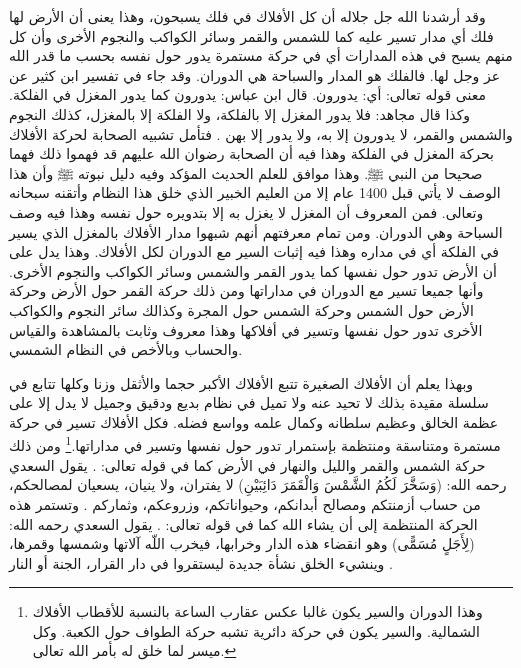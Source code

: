 وقد أرشدنا الله جل جلاله أن كل الأفلاك في فلك يسبحون، وهذا يعنى أن الأرض لها فلك أي مدار تسير عليه كما للشمس والقمر وسائر الكواكب والنجوم الأخرى وأن كل منهم يسبح في هذه المدارات أي في حركة مستمرة يدور حول نفسه بحسب ما قدر الله عز وجل لها. فالفلك هو المدار والسباحة هي الدوران. وقد جاء في تفسير ابن كثير عن معنى قوله تعالى: \quranayah*[36][40][12] {\footnotesize (\surahname*[36])} أي: يدورون. قال ابن عباس: يدورون كما يدور المغزل في الفلكة. وكذا قال مجاهد: فلا يدور المغزل إلا بالفلكة، ولا الفلكة إلا بالمغزل، كذلك النجوم والشمس والقمر، لا يدورون إلا به، ولا يدور إلا بهن \href{https://shamela.ws/book/8473/2750#p4}{\faExternalLink} \cite{tafsir_ibnKathir}. فتأمل تشبيه الصحابة لحركة الأفلاك بحركة المغزل في الفلكة وهذا فيه أن الصحابة رضوان الله عليهم قد فهموا ذلك فهما صحيحا من النبي ﷺ. وهذا موافق للعلم الحديث المؤكد وفيه دليل نبوته ﷺ وأن هذا الوصف لا يأتي قبل 1400 عام إلا من العليم الخبير الذي خلق هذا النظام وأتقنه سبحانه وتعالى. فمن المعروف أن المغزل لا يغزل به إلا بتدويره حول نفسه وهذا فيه وصف السباحة وهي الدوران. ومن تمام معرفتهم أنهم شبهوا مدار الأفلاك بالمغزل الذي يسير في الفلكة أي في مداره وهذا فيه إثبات السير مع الدوران لكل الأفلاك. وهذا يدل على أن الأرض تدور حول نفسها كما يدور القمر والشمس وسائر الكواكب والنجوم الأخرى. وأنها جميعا تسير مع الدوران في مداراتها ومن ذلك حركة القمر حول الأرض وحركة الأرض حول الشمس وحركة الشمس حول المجرة وكذالك سائر النجوم والكواكب الأخرى تدور حول نفسها وتسير في أفلاكها وهذا معروف وثابت بالمشاهدة والقياس والحساب وبالأخص في النظام الشمسي. 

وبهذا يعلم أن الأفلاك الصغيرة تتبع الأفلاك الأكبر حجما والأثقل وزنا وكلها تتابع في سلسلة مقيدة بذلك لا تحيد عنه ولا تميل في نظام بديع ودقيق وجميل لا يدل إلا على عظمة الخالق وعظيم سلطانه وكمال علمه وواسع فضله. فكل الأفلاك تسير في حركة مستمرة ومتناسقة ومنتظمة بإستمرار تدور حول نفسها وتسير في مداراتها.\footnote{وهذا الدوران والسير يكون غالبا عكس عقارب الساعة بالنسبة للأقطاب الأفلاك الشمالية. والسير يكون في حركة دائرية تشبه حركة الطواف حول الكعبة. وكل ميسر لما خلق له بأمر الله تعالى.} ومن ذلك حركة الشمس والقمر والليل والنهار في الأرض كما في قوله تعالى: \quranayah*[14][33]{\footnotesize (\surahname*[14])}. يقول السعدي رحمه الله: (وَسَخَّرَ لَكُمُ الشَّمْسَ وَالْقَمَرَ دَائِبَيْنِ) لا يفتران، ولا ينيان، يسعيان لمصالحكم، من حساب أزمنتكم ومصالح أبدانكم، وحيواناتكم، وزروعكم، وثماركم \href{https://shamela.ws/book/42/905#p5}{\faExternalLink} \cite{tafsir_Saadi}. وتستمر هذه الحركة المنتظمة إلى أن يشاء الله كما في قوله تعالى: \quranayah*[39][5]{\footnotesize (\surahname*[39])}. \href{https://shamela.ws/book/42/905#p5}{\faExternalLink} \cite{tafsir_Saadi} يقول السعدي رحمه الله: (لِأَجَلٍ مُسَمًّى) وهو انقضاء هذه الدار وخرابها، فيخرب اللّه آلاتها وشمسها وقمرها، وينشيء الخلق نشأة جديدة ليستقروا في دار القرار، الجنة أو النار \href{https://shamela.ws/book/42/1623#p4}{\faExternalLink} \cite{tafsir_Saadi}.

